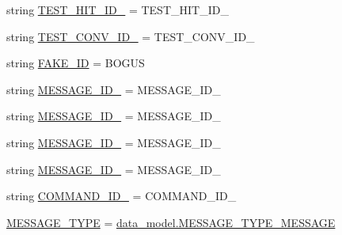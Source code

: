 \begin{DoxyCompactItemize}
\item 
string \hyperlink{namespaceparlai_1_1mturk_1_1core_1_1test_1_1test__full__system_a9207002c372c97eac0fbfbaa83dd9431}{T\+E\+S\+T\+\_\+\+H\+I\+T\+\_\+\+I\+D\+\_} = \textquotesingle{}T\+E\+S\+T\+\_\+\+H\+I\+T\+\_\+\+I\+D\+\_\textquotesingle{}
\item 
string \hyperlink{namespaceparlai_1_1mturk_1_1core_1_1test_1_1test__full__system_a2dd7c666f97258a1e10e680e4f81f556}{T\+E\+S\+T\+\_\+\+C\+O\+N\+V\+\_\+\+I\+D\+\_} = \textquotesingle{}T\+E\+S\+T\+\_\+\+C\+O\+N\+V\+\_\+\+I\+D\+\_\textquotesingle{}
\item 
string \hyperlink{namespaceparlai_1_1mturk_1_1core_1_1test_1_1test__full__system_a562f98e142265559473265c863509cf2}{F\+A\+K\+E\+\_\+\+ID} = \textquotesingle{}B\+O\+G\+US\textquotesingle{}
\item 
string \hyperlink{namespaceparlai_1_1mturk_1_1core_1_1test_1_1test__full__system_af4c8bc21d78bcfe5a880215a87c1019b}{M\+E\+S\+S\+A\+G\+E\+\_\+\+I\+D\+\_} = \textquotesingle{}M\+E\+S\+S\+A\+G\+E\+\_\+\+I\+D\+\_\textquotesingle{}
\item 
string \hyperlink{namespaceparlai_1_1mturk_1_1core_1_1test_1_1test__full__system_a1fff7d388cae6b92e11cd4944c0ee06a}{M\+E\+S\+S\+A\+G\+E\+\_\+\+I\+D\+\_} = \textquotesingle{}M\+E\+S\+S\+A\+G\+E\+\_\+\+I\+D\+\_\textquotesingle{}
\item 
string \hyperlink{namespaceparlai_1_1mturk_1_1core_1_1test_1_1test__full__system_aa76f1f8de476e0590fc5343e9d855cc0}{M\+E\+S\+S\+A\+G\+E\+\_\+\+I\+D\+\_} = \textquotesingle{}M\+E\+S\+S\+A\+G\+E\+\_\+\+I\+D\+\_\textquotesingle{}
\item 
string \hyperlink{namespaceparlai_1_1mturk_1_1core_1_1test_1_1test__full__system_ac8333aa6ee06b349dbe1a71f200c3c8c}{M\+E\+S\+S\+A\+G\+E\+\_\+\+I\+D\+\_} = \textquotesingle{}M\+E\+S\+S\+A\+G\+E\+\_\+\+I\+D\+\_\textquotesingle{}
\item 
string \hyperlink{namespaceparlai_1_1mturk_1_1core_1_1test_1_1test__full__system_a7dfe23cde7a567a97f5219eb3f4c1e6a}{C\+O\+M\+M\+A\+N\+D\+\_\+\+I\+D\+\_} = \textquotesingle{}C\+O\+M\+M\+A\+N\+D\+\_\+\+I\+D\+\_\textquotesingle{}
\item 
\hyperlink{namespaceparlai_1_1mturk_1_1core_1_1test_1_1test__full__system_acf878fb471bb0af522f8f0a2020199c7}{M\+E\+S\+S\+A\+G\+E\+\_\+\+T\+Y\+PE} = \hyperlink{namespaceparlai_1_1mturk_1_1core_1_1data__model_a61c70a0a282586fc0e09b40ada1f28bf}{data\+\_\+model.\+M\+E\+S\+S\+A\+G\+E\+\_\+\+T\+Y\+P\+E\+\_\+\+M\+E\+S\+S\+A\+GE}
\item 

\end{DoxyCompactItemize}
